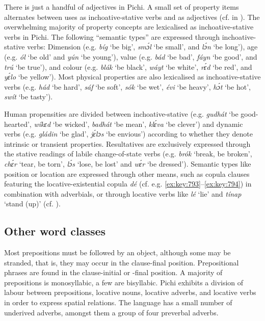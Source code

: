 There is just a handful of adjectives in Pichi. A small set of property items alternates between uses as inchoative-stative verbs and as adjectives (cf.  in ). {\fff}The overwhelming majority of property concepts are lexicalised as inchoative-stative verbs in Pichi. The following “semantic types” \citep[3]{dixon_adjective_2004} are expressed through inchoative-stative verbs: Dimension (e.g. \textit{bíg} ‘be big’, \textit{smɔ́l} ‘be small’, and \textit{lɔ́n} ‘be long’), age (e.g. \textit{ól} ‘be old’ and \textit{yún} ‘be young’), value (e.g. \textit{bád} ‘be bad’, \textit{fáyn} ‘be good’, and \textit{trú} ‘be true’), and colour (e.g. \textit{blák} ‘be black’, \textit{wáyt} ‘be white’, \textit{rɛ́d} ‘be red’, and \textit{yɛ́lo} ‘be yellow’). Most physical properties are also lexicalised as inchoative-stative verbs (e.g. \textit{hád} ‘be hard’, \textit{sáf} ‘be soft’, \textit{sók} ‘be wet’, \textit{évi} ‘be heavy’, \textit{hɔ́t} ‘be hot’, \textit{swít} ‘be tasty’). 



Human propensities are divided between inchoative-stative (e.g. \textit{gudhát} ‘be good-hearted’, \textit{wíkɛd} ‘be wicked’, \textit{badhát} ‘be mean’, \textit{klɛ́va} ‘be clever’) and dynamic verbs (e.g. \textit{gládin} ‘be glad’, \textit{jɛ́lɔs} ‘be envious’) according to whether they denote intrinsic or transient properties. Resultatives{\fff} are exclusively expressed through the stative readings of labile change-of-state verbs (e.g. \textit{brók} ‘break, be broken’, \textit{chɛ́r} ‘tear, be torn’, \textit{lɔ́s} ‘lose, be lost’ and \textit{wɛ́r} ‘be dressed’). Semantic types like position or location are expressed through other means, such as copula clauses featuring the locative-existential copula \textit{dé} (cf. e.g. \ref{ex:key:793}–\ref{ex:key:794}) in combination with adverbials, or through locative verbs like {\fff}\textit{lé} ‘lie’ and \textit{tínap} ‘stand (up)’ (cf. ).


\subsection{Other word classes}\label{sec:4.1.3}

Most prepositions must be followed by an object, although some may be stranded, that is, they may occur in the clause-final position. Prepositional phrases are found in the clause-initial or -final position. A majority of prepositions is monosyllabic, a few are bisyllabic. Pichi exhibits a division of labour between prepositions, locative nouns, locative adverbs, and locative verbs in order to express spatial relations. The language has a small number of underived adverbs, amongst them a group of four preverbal adverbs.


